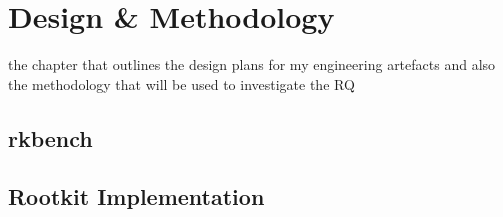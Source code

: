 \chapter{Design \& Methodology}

the chapter that outlines the design plans for my engineering artefacts and also the methodology that will be used to
investigate the RQ
\section{rkbench}

\section{Rootkit Implementation}